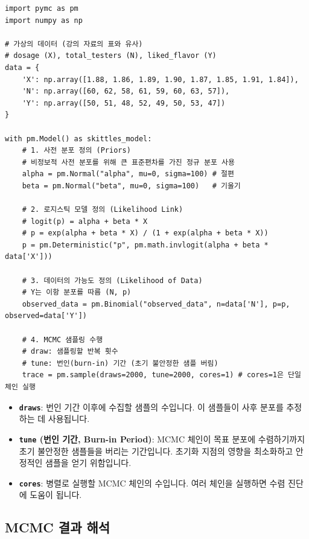 \documentclass[11pt,a4paper]{article}
\theoremstyle{definition}
\begin{document}
\begin{lstlisting}[style=pythonstyle, caption={\texttt{pymc}를 이용한 MCMC 모델 설정 및 샘플링 예시}, label={lst:pymc_mcmc}]
import pymc as pm
import numpy as np

# 가상의 데이터 (강의 자료의 표와 유사)
# dosage (X), total_testers (N), liked_flavor (Y)
data = {
    'X': np.array([1.88, 1.86, 1.89, 1.90, 1.87, 1.85, 1.91, 1.84]),
    'N': np.array([60, 62, 58, 61, 59, 60, 63, 57]),
    'Y': np.array([50, 51, 48, 52, 49, 50, 53, 47])
}

with pm.Model() as skittles_model:
    # 1. 사전 분포 정의 (Priors)
    # 비정보적 사전 분포를 위해 큰 표준편차를 가진 정규 분포 사용
    alpha = pm.Normal("alpha", mu=0, sigma=100) # 절편
    beta = pm.Normal("beta", mu=0, sigma=100)   # 기울기

    # 2. 로지스틱 모델 정의 (Likelihood Link)
    # logit(p) = alpha + beta * X
    # p = exp(alpha + beta * X) / (1 + exp(alpha + beta * X))
    p = pm.Deterministic("p", pm.math.invlogit(alpha + beta * data['X']))

    # 3. 데이터의 가능도 정의 (Likelihood of Data)
    # Y는 이항 분포를 따름 (N, p)
    observed_data = pm.Binomial("observed_data", n=data['N'], p=p, observed=data['Y'])

    # 4. MCMC 샘플링 수행
    # draw: 샘플링할 반복 횟수
    # tune: 번인(burn-in) 기간 (초기 불안정한 샘플 버림)
    trace = pm.sample(draws=2000, tune=2000, cores=1) # cores=1은 단일 체인 실행
\end{lstlisting}

\begin{infobox}[title=MCMC 샘플링 과정의 주요 파라미터]
\begin{itemize}
    \item \textbf{\texttt{draws}}: 번인 기간 이후에 수집할 샘플의 수입니다. 이 샘플들이 사후 분포를 추정하는 데 사용됩니다.
    \item \textbf{\texttt{tune} (번인 기간, Burn-in Period)}: MCMC 체인이 목표 분포에 수렴하기까지 초기 불안정한 샘플들을 버리는 기간입니다. 초기화 지점의 영향을 최소화하고 안정적인 샘플을 얻기 위함입니다.
    \item \textbf{\texttt{cores}}: 병렬로 실행할 MCMC 체인의 수입니다. 여러 체인을 실행하면 수렴 진단에 도움이 됩니다.
\end{itemize}
\end{infobox}

\subsection*{MCMC 결과 해석}
\end{document}
